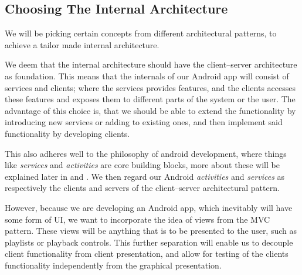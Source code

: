 \subsection{Choosing The Internal Architecture}
We will be picking certain concepts from different architectural patterns, to achieve a tailor made internal architecture.

We deem that the internal architecture should have the client--server architecture as foundation.
This means that the internals of our Android app will consist of services and clients;
where the services provides features, and the clients accesses these features and exposes them to different parts of the system or the user.
The advantage of this choice is, that we should be able to extend the functionality by introducing new services or adding to existing ones, and then implement said functionality by developing clients.

This also adheres well to the philosophy of android development, where things like \textit{services} and \textit{activities} are core building blocks, more about these will be explained later in  and .
We then regard our Android \textit{activities} and \textit{services} as respectively the clients and servers of the client--server architectural pattern.

However, because we are developing an Android app, which inevitably will have some form of \ac{UI}, we want to incorporate the idea of views from the \ac{MVC} pattern.
These views will be anything that is to be presented to the user, such as playlists or playback controls.
This further separation will enable us to decouple client functionality from client presentation, and allow for testing of the clients functionality independently from the graphical presentation.
